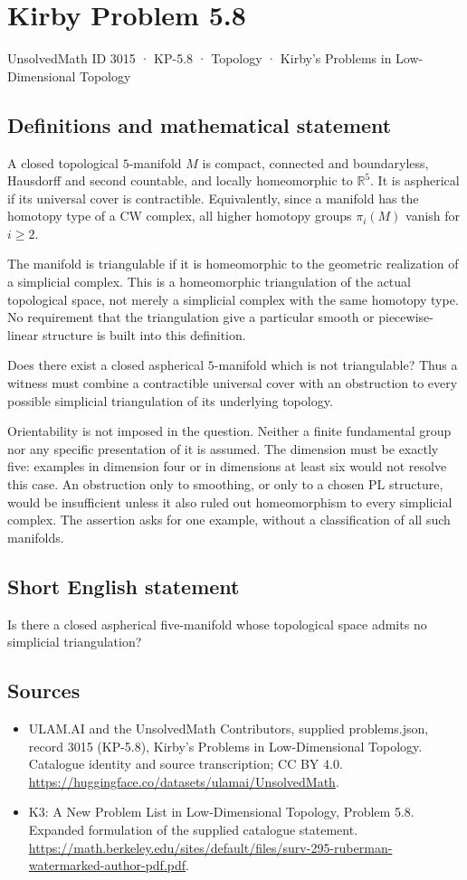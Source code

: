 \documentclass[11pt,a4paper]{article}
\begin{document}
\section*{Kirby Problem 5.8}\label{3015}
{\small UnsolvedMath ID 3015 · KP-5.8 · Topology · Kirby's Problems in Low-Dimensional Topology}
\subsection{Definitions and mathematical statement}
A closed topological $5$-manifold $M$ is compact, connected and
boundaryless, Hausdorff and second countable, and locally
homeomorphic to $\mathbb R^5$. It is aspherical if its universal
cover is contractible. Equivalently, since a manifold has the
homotopy type of a CW complex, all higher homotopy groups
$\pi_i(M)$ vanish for $i\ge2$.

The manifold is triangulable if it is homeomorphic to the
geometric realization of a simplicial complex. This is a
homeomorphic triangulation of the actual topological space,
not merely a simplicial complex with the same homotopy type.
No requirement that the triangulation give a particular smooth
or piecewise-linear structure is built into this definition.

Does there exist a closed aspherical $5$-manifold which is
not triangulable? Thus a witness must combine a contractible
universal cover with an obstruction to every possible simplicial
triangulation of its underlying topology.

Orientability is not imposed in the question. Neither a finite
fundamental group nor any specific presentation of it is assumed.
The dimension must be exactly five: examples in dimension four
or in dimensions at least six would not resolve this case.
An obstruction only to smoothing, or only to a chosen PL
structure, would be insufficient unless it also ruled out
homeomorphism to every simplicial complex. The assertion asks
for one example, without a classification of all such manifolds.
\subsection{Short English statement}
Is there a closed aspherical five-manifold whose topological space admits no simplicial triangulation?
\subsection{Sources}
\begin{itemize}
\item[S1] ULAM.AI and the UnsolvedMath Contributors, supplied problems.json, record 3015 (KP-5.8), Kirby's Problems in Low-Dimensional Topology. Catalogue identity and source transcription; CC BY 4.0.
\url{https://huggingface.co/datasets/ulamai/UnsolvedMath}.
\item[S2] K3: A New Problem List in Low-Dimensional Topology, Problem 5.8. Expanded formulation of the supplied catalogue statement.
\url{https://math.berkeley.edu/sites/default/files/surv-295-ruberman-watermarked-author-pdf.pdf}.
\end{itemize}
\end{document}
